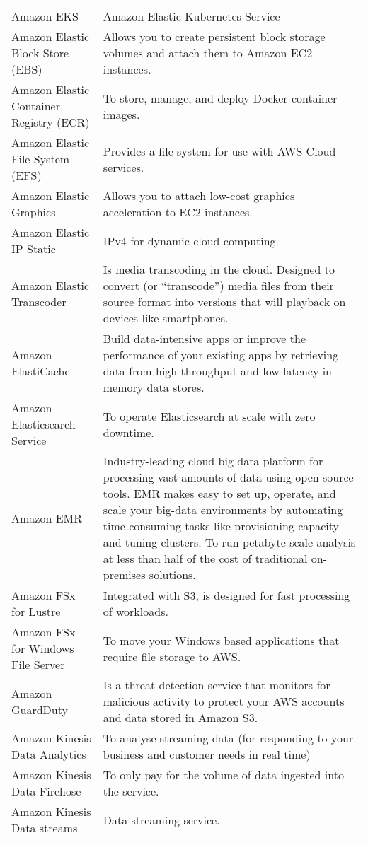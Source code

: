 \documentclass[]{book}
\begin{document}
\begin{table}
\begin{tabular}[t]{ll}
Amazon EKS & Amazon Elastic Kubernetes Service\\
Amazon Elastic Block Store (EBS) & Allows you to create persistent block storage volumes and attach them to Amazon EC2 instances.\\
Amazon Elastic Container Registry (ECR) & To store, manage, and deploy Docker container images.\\
Amazon Elastic File System (EFS) & Provides a file system for use with AWS Cloud services.\\
\addlinespace
Amazon Elastic Graphics & Allows you to attach low-cost graphics acceleration to EC2 instances.\\
Amazon Elastic IP   Static & IPv4 for dynamic cloud computing.\\
Amazon Elastic Transcoder & Is media transcoding in the cloud. Designed to convert (or “transcode”) media files from their source format into versions that will playback on devices like smartphones.\\
Amazon ElastiCache & Build data-intensive apps or improve the performance of your existing apps by retrieving data from high throughput and low latency in-memory data stores.\\
Amazon Elasticsearch Service & To operate Elasticsearch at scale with zero downtime.\\
\addlinespace
Amazon EMR & Industry-leading cloud big data platform for processing vast amounts of data using open-source tools. EMR makes easy to set up, operate, and scale your big-data environments by automating time-consuming tasks like provisioning capacity and tuning clusters. To run petabyte-scale analysis at less than half of the cost of traditional on-premises solutions.\\
Amazon FSx for Lustre & Integrated with S3, is designed for fast processing of workloads.\\
Amazon FSx for Windows File Server & To move your Windows based applications that require file storage to AWS.\\
Amazon GuardDuty & Is a threat detection service that monitors for malicious activity to protect your AWS accounts and data stored in Amazon S3.\\
Amazon Kinesis Data Analytics & To analyse streaming data (for responding to your business and customer needs in real time)\\
\addlinespace
Amazon Kinesis Data Firehose & To only pay for the volume of data ingested into the service.\\
Amazon Kinesis Data streams & Data streaming service.\\

\end{tabular}
\end{table}
\end{document}
